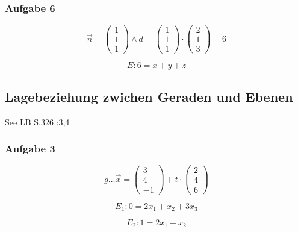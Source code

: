 \documentclass{article}
\begin{document}
\subsubsection*{Aufgabe 6}

\begin{equation}
	\overrightarrow{n} = \begin{pmatrix}1\\1\\1\end{pmatrix}  \wedge d = \begin{pmatrix}1\\1\\1\end{pmatrix} \cdot \begin{pmatrix}2\\1\\3\end{pmatrix} = 6
\end{equation}

\begin{equation}
	E: 6 = x + y + z
\end{equation}

\subsection*{Lagebeziehung zwichen Geraden und Ebenen}
See LB S.326 :3,4

\subsubsection*{Aufgabe 3}

\begin{equation}
	g \dots \overrightarrow{x} = \begin{pmatrix}3\\4\\-1\end{pmatrix} + t \cdot \begin{pmatrix}2\\4\\6\end{pmatrix}
\end{equation}

\begin{equation}
	E_1 : 0 = 2x_1 + x_2 + 3x_3
\end{equation}

\begin{equation}
	E_2 : 1 = 2x_1 + x_2
\end{equation}
\end{document}
